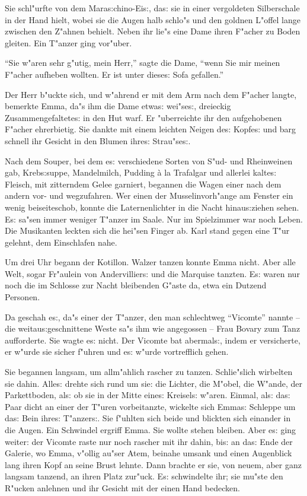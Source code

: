 \documentclass[oneside,12pt]{book}
\newcommand{\s}{s:}%
\begin{document}
Sie schl"urfte von dem Mara{\s}chino-Ei{\s}, da{\s} sie in einer
vergoldeten Silberschale in der Hand hielt, wobei sie die Augen
halb schlo"s und den goldnen L"offel lange zwischen den Z"ahnen
behielt. Neben ihr lie"s eine Dame ihren F"acher zu Boden gleiten.
Ein T"anzer ging vor"uber.

"`Sie w"aren sehr g"utig, mein Herr,"' sagte die Dame, "`wenn Sie
mir meinen F"acher aufheben wollten. Er ist unter diese{\s} Sofa
gefallen."'

Der Herr b"uckte sich, und w"ahrend er mit dem Arm nach dem
F"acher langte, bemerkte Emma, da"s ihm die Dame etwa{\s}
wei"se{\s}, dreieckig Zusammengefaltete{\s} in den Hut warf. Er
"uberreichte ihr den aufgehobenen F"acher ehrerbietig. Sie dankte
mit einem leichten Neigen de{\s} Kopfe{\s} und barg schnell ihr
Gesicht in den Blumen ihre{\s} Strau"se{\s}.

Nach dem Souper, bei dem e{\s} verschiedene Sorten von S"ud- und
Rheinweinen gab, Kreb{\s}suppe, Mandelmilch, Pudding \`a la
Trafalgar und allerlei kalte{\s} Fleisch, mit zitterndem Gelee
garniert, begannen die Wagen einer nach dem andern vor- und
wegzufahren. Wer einen der Musselinvorh"ange am Fenster ein wenig
beiseiteschob, konnte die Laternenlichter in die Nacht
hinau{\s}ziehen sehen. E{\s} sa"sen immer weniger T"anzer im
Saale. Nur im Spielzimmer war noch Leben. Die Musikanten leckten
sich die hei"sen Finger ab. Karl stand gegen eine T"ur gelehnt,
dem Einschlafen nahe.

Um drei Uhr begann der Kotillon. Walzer tanzen konnte Emma nicht.
Aber alle Welt, sogar Fr"aulein von Andervillier{\s} und die
Marquise tanzten. E{\s} waren nur noch die im Schlosse zur Nacht
bleibenden G"aste da, etwa ein Dutzend Personen.

Da geschah e{\s}, da"s einer der T"anzer, den man schlechtweg
"`Vicomte"' nannte -- die weitau{\s}geschnittene Weste sa"s ihm
wie angegossen -- Frau Bovary zum Tanz aufforderte. Sie wagte
e{\s} nicht. Der Vicomte bat abermal{\s}, indem er versicherte, er
w"urde sie sicher f"uhren und e{\s} w"urde vortrefflich gehen.

Sie begannen langsam, um allm"ahlich rascher zu tanzen.
Schlie"slich wirbelten sie dahin. Alle{\s} drehte sich rund um
sie: die Lichter, die M"obel, die W"ande, der Parkettboden, al{\s}
ob sie in der Mitte eine{\s} Kreisel{\s} w"aren. Einmal, al{\s}
da{\s} Paar dicht an einer der T"uren vorbeitanzte, wickelte sich
Emma{\s} Schleppe um da{\s} Bein ihre{\s} T"anzer{\s}. Sie
f"uhlten sich beide und blickten sich einander in die Augen. Ein
Schwindel ergriff Emma. Sie wollte stehen bleiben. Aber e{\s} ging
weiter: der Vicomte raste nur noch rascher mit ihr dahin, bi{\s}
an da{\s} Ende der Galerie, wo Emma, v"ollig au"ser Atem, beinahe
umsank und einen Augenblick lang ihren Kopf an seine Brust lehnte.
Dann brachte er sie, von neuem, aber ganz langsam tanzend, an
ihren Platz zur"uck. E{\s} schwindelte ihr; sie mu"ste den R"ucken
anlehnen und ihr Gesicht mit der einen Hand bedecken.
\end{document}

